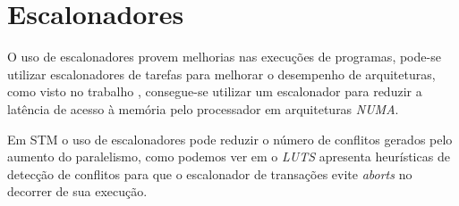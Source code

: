 \documentclass[diss,capa]{texufpel}
\begin{document}





\chapter{Escalonadores}
\label{chapter::escalonadores}

O uso de escalonadores provem melhorias nas execuções de programas, pode-se utilizar escalonadores de tarefas para melhorar o desempenho de arquiteturas, como visto no trabalho \cite{Rodolfo:2014}, consegue-se utilizar um escalonador para reduzir a latência de acesso à memória pelo processador em arquiteturas \emph{NUMA}.

Em STM o uso de escalonadores pode reduzir o número de conflitos gerados pelo aumento do paralelismo, como podemos ver em \cite{Nicacio2012} o \emph{LUTS} apresenta heurísticas de detecção de conflitos para que o escalonador de transações evite \emph{aborts} no decorrer de sua execução.
\end{document}
